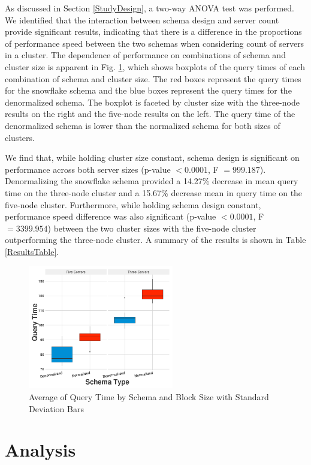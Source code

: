 \documentclass[journal]{IEEEtran}
\begin{document}
As discussed in Section \ref{StudyDesign}, a two-way ANOVA test was performed.
We identified that the interaction between schema design and server count provide significant results,
indicating that there is a difference in the proportions of performance speed between the two schemas when considering count of servers in a cluster.
The dependence of performance on combinations of schema and cluster size is apparent in Fig. \ref{Results},
 which shows boxplots of the query times of each combination of schema and cluster size.
The red boxes represent the query times for the snowflake schema and
 the blue boxes represent the query times for the denormalized schema.
The boxplot is faceted by cluster size with the three-node results on the right and
 the five-node results on the left.
The query time of the denormalized schema is lower than the normalized schema for both sizes of clusters.

We find that, while holding cluster size constant,
 schema design is significant on performance across both server sizes
 (p-value $< 0.0001$, F $ = 999.187$). 
Denormalizing the snowflake schema provided a 14.27\% decrease in mean query time on
 the three-node cluster and a 15.67\% decrease mean in query time on the five-node cluster.
Furthermore, while holding schema design constant, 
 performance speed difference was also significant 
 (p-value $< 0.0001$, F $= 3399.954$) 
 between the two cluster sizes with the five-node cluster outperforming
 the three-node cluster. 
A summary of the results is shown in Table \ref{ResultsTable}.

\begin{figure}
	\centering
	\includegraphics[width=2.5in]{Rplot.png}
	\caption{Average of Query Time by Schema and Block Size with Standard Deviation Bars}
	\label{Results}
\end{figure}

\section{Analysis}
\end{document}

